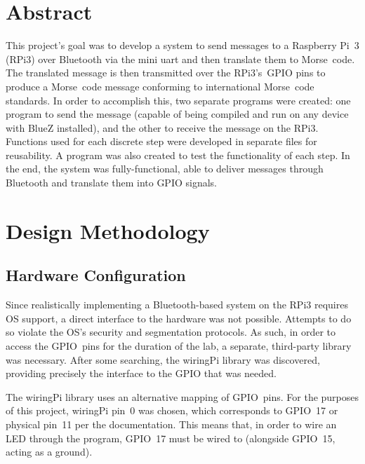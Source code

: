\documentclass[11pt]{article}
\begin{document}


\section{Abstract}
\label{sec:abstract}


This project's goal was to develop a system to send messages to a Raspberry Pi~3 (RPi3) over Bluetooth via the mini uart and then translate them to Morse~code.
The translated message is then transmitted over the RPi3's~GPIO pins to produce a Morse~code message conforming to international Morse~code standards.
In order to accomplish this, two separate programs were created: one program to send the message (capable of being compiled and run on any device with BlueZ installed), and the other to receive the message on the RPi3.
Functions used for each discrete step were developed in separate files for reusability.
A program was also created to test the functionality of each step.
In the end, the system was fully-functional, able to deliver messages through Bluetooth and translate them into GPIO signals.


\section{Design Methodology}
\label{sec:design_methodology}




\subsection{Hardware Configuration}
\label{sub:hardware_configuration}


Since realistically implementing a Bluetooth-based system on the RPi3 requires OS support, a direct interface to the hardware was not possible.
Attempts to do so violate the OS's security and segmentation protocols.
As such, in order to access the GPIO~pins for the duration of the lab, a separate, third-party library was necessary.
After some searching, the wiringPi library was discovered, providing precisely the interface to the GPIO that was needed.


The wiringPi library uses an alternative mapping of GPIO~pins.
For the purposes of this project, wiringPi pin~0 was chosen, which corresponds to GPIO~17 or physical pin~11 per the documentation.
This means that, in order to wire an LED through the program, GPIO~17 must be wired to (alongside GPIO~15, acting as a ground).
\end{document}
